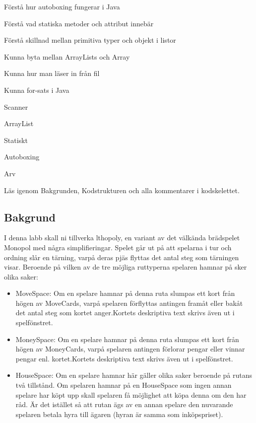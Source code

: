 

\Lab{\LabWeekELEVEN}

\begin{Goals}
\item Förstå hur autoboxing fungerar i Java
\item Förstå vad statiska metoder och attribut innebär
\item Förstå skillnad mellan primitiva typer och objekt i listor
\item Kunna byta mellan ArrayLists och Array
\item Kunna hur man läser in från fil
\item Kunna for-sats i Java
\end{Goals}

\begin{Preparations}
\item Scanner
\item ArrayList
\item Statiskt
\item Autoboxing
\item Arv
\item Läs igenom Bakgrunden, Kodstrukturen och alla kommentarer i kodskelettet.
\end{Preparations}

\subsection{Bakgrund}
I denna labb skall ni tillverka lthopoly, en variant av det välkända brädspelet Monopol med några simplifieringar. Spelet går ut på att spelarna i tur och ordning slår en tärning, varpå deras pjäs flyttas det antal steg som tärningen visar. 
Beroende på vilken av de tre möjliga ruttyperna spelaren hamnar på sker olika saker:

\begin{itemize}
\item MoveSpace: Om en spelare hamnar på denna ruta slumpas ett kort från högen av MoveCards, varpå spelaren förflyttas antingen framåt eller bakåt det antal steg som kortet anger.Kortets deskriptiva text skrivs även ut i spelfönstret.
\item MoneySpace: Om en spelare hamnar på denna ruta slumpas ett kort från högen av MoneyCards, varpå spelaren antingen förlorar pengar eller vinnar pengar enl. kortet.Kortets deskriptiva text skrivs även ut i spelfönstret.
\item HouseSpace: Om en spelare hamnar här gäller olika saker beroende på rutans två tillstånd. Om spelaren hamnar på en HouseSpace som ingen annan spelare har köpt upp skall spelaren få möjlighet att köpa denna om den har råd. Är det istället så att rutan ägs av en annan spelare den nuvarande spelaren betala hyra till ägaren (hyran är samma som inköpspriset). 
\end{itemize}

